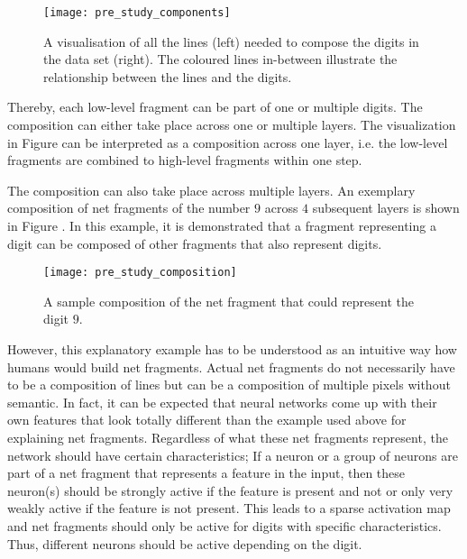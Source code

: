 \begin{figure}[h]
    \centering
    \texttt{[image: pre\_study\_components]}
    \caption[Line Types in Straight Line Digits Dataset]{A visualisation of all the lines (left) needed to compose the digits in the data set (right). The coloured lines in-between illustrate the relationship between the lines and the digits.}
\end{figure}

Thereby, each low-level fragment can be part of one or multiple digits.
The composition can either take place across one or multiple layers.
The visualization in Figure  can be interpreted as a composition across one layer, i.e. the low-level fragments are combined to high-level fragments within one step.

The composition can also take place across multiple layers. 
An exemplary composition of net fragments of the number $9$ across $4$ subsequent layers is shown in Figure .
In this example, it is demonstrated that a fragment representing a digit can be composed of other fragments that also represent digits.


\begin{figure}[h]
    \centering
    \texttt{[image: pre\_study\_composition]}
    \caption[Sample Net Fragment Composition]{A sample composition of the net fragment that could represent the digit $9$.}
\end{figure}

However, this explanatory example has to be understood as an intuitive way how humans would build net fragments.
Actual net fragments do not necessarily have to be a composition of lines but can be a composition of multiple pixels without semantic.
In fact, it can be expected that neural networks come up with their own features that look totally different than the example used above for explaining net fragments.
Regardless of what these net fragments represent, the network should have certain characteristics;
If a neuron or a group of neurons are part of a net fragment that represents a feature in the input, then these neuron(s) should be strongly active if the feature is present and not or only very weakly active if the feature is not present.
This leads to a sparse activation map and net fragments should only be active for digits with specific characteristics.
Thus, different neurons should be active depending on the digit.

